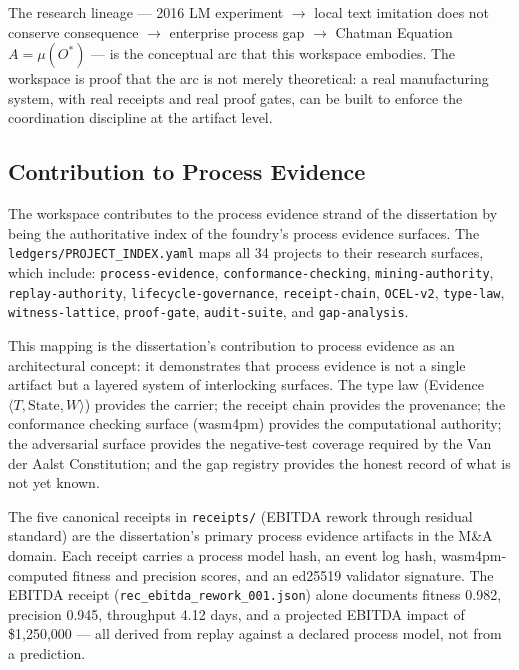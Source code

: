The research lineage --- 2016 LM experiment $\to$ local text imitation does not conserve
consequence $\to$ enterprise process gap $\to$ Chatman Equation $A = \mu(O^*)$ --- is the
conceptual arc that this workspace embodies. The workspace is proof that the arc is not merely
theoretical: a real manufacturing system, with real receipts and real proof gates, can be built
to enforce the coordination discipline at the artifact level.

\subsection{Contribution to Process Evidence}
\label{sec:phd-thesis-contribution-evidence}

The workspace contributes to the process evidence strand of the dissertation by being the
authoritative index of the foundry's process evidence surfaces. The
\texttt{ledgers/PROJECT\_INDEX.yaml} maps all 34 projects to their research surfaces, which
include: \texttt{process-evidence}, \texttt{conformance-checking}, \texttt{mining-authority},
\texttt{replay-authority}, \texttt{lifecycle-governance}, \texttt{receipt-chain},
\texttt{OCEL-v2}, \texttt{type-law}, \texttt{witness-lattice}, \texttt{proof-gate},
\texttt{audit-suite}, and \texttt{gap-analysis}.

This mapping is the dissertation's contribution to process evidence as an architectural
concept: it demonstrates that process evidence is not a single artifact but a layered system
of interlocking surfaces. The type law (Evidence$\langle T, \text{State}, W\rangle$) provides
the carrier; the receipt chain provides the provenance; the conformance checking surface
(wasm4pm) provides the computational authority; the adversarial surface provides the
negative-test coverage required by the Van der Aalst Constitution; and the gap registry
provides the honest record of what is not yet known.

The five canonical receipts in \texttt{receipts/} (EBITDA rework through residual standard)
are the dissertation's primary process evidence artifacts in the M\&A domain. Each receipt
carries a process model hash, an event log hash, wasm4pm-computed fitness and precision
scores, and an ed25519 validator signature. The EBITDA receipt
(\texttt{rec\_ebitda\_rework\_001.json}) alone documents fitness 0.982, precision 0.945,
throughput 4.12 days, and a projected EBITDA impact of \$1,250,000 --- all derived from
replay against a declared process model, not from a prediction.


